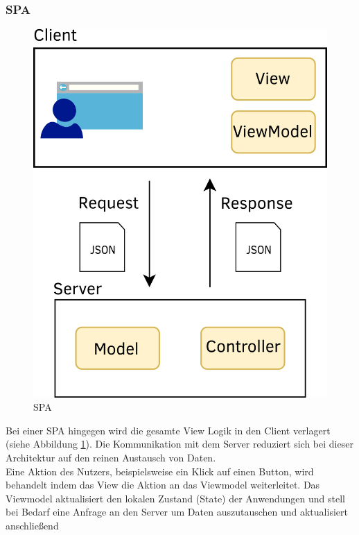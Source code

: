 \subsubsection{\acl{SPA}}
\begin{figure}
  \begin{center}
    \includegraphics[scale=1.5]{images/spa_web_app.png}
  \end{center}
  \caption{\acl{SPA}}
  \label{fig:spaweb}
\end{figure}
Bei einer \ac{SPA} hingegen wird die gesamte View Logik in den Client verlagert
(siehe Abbildung \ref{fig:spaweb}). Die Kommunikation mit dem Server reduziert
sich bei dieser Architektur auf den reinen Austausch von Daten.\\
Eine Aktion des Nutzers, beispielsweise ein Klick auf einen Button, wird behandelt indem das
View die Aktion an das Viewmodel weiterleitet. Das Viewmodel aktualisiert den
lokalen Zustand (State) der Anwendungen und stell bei Bedarf eine Anfrage an den Server um Daten auszutauschen und aktualisiert anschließend
